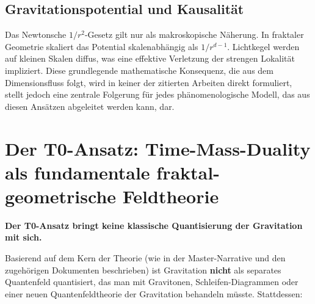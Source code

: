 	\subsection{Gravitationspotential und Kausalität}
	Das Newtonsche $1/r^2$-Gesetz gilt nur als makroskopische Näherung. In fraktaler Geometrie skaliert das Potential skalenabhängig als $1/r^{d-1}$. Lichtkegel werden auf kleinen Skalen diffus, was eine effektive Verletzung der strengen Lokalität impliziert. Diese grundlegende mathematische Konsequenz, die aus dem Dimensionsfluss folgt, wird in keiner der zitierten Arbeiten direkt formuliert, stellt jedoch eine zentrale Folgerung für jedes phänomenologische Modell, das aus diesen Ansätzen abgeleitet werden kann, dar.
	
	\section{Der T0-Ansatz: Time-Mass-Duality als fundamentale fraktal-geometrische Feldtheorie}
	
	\textbf{Der T0-Ansatz bringt keine klassische Quantisierung der Gravitation mit sich.}
	
	Basierend auf dem Kern der Theorie (wie in der Master-Narrative und den zugehörigen Dokumenten beschrieben) ist Gravitation \textbf{nicht} als separates Quantenfeld quantisiert, das man mit Gravitonen, Schleifen-Diagrammen oder einer neuen Quantenfeldtheorie der Gravitation behandeln müsste. Stattdessen:
	
